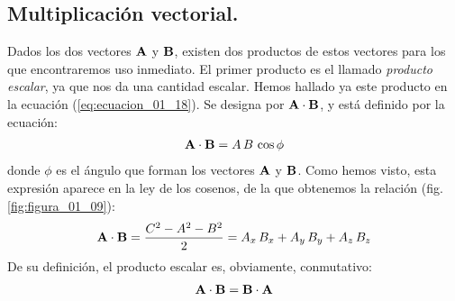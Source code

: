 \documentclass[12pt]{article}
\begin{document}
\subsection{Multiplicación vectorial.}

Dados los dos vectores $\vb{A}$ y $\vb{B}$, existen dos productos de estos vectores para los que encontraremos uso inmediato. El primer producto es el llamado \emph{producto escalar}, ya que nos da una cantidad escalar. Hemos hallado ya este producto en la ecuación (\ref{eq:ecuacion_01_18}). Se designa por $\vb{A} \cdot \vb{B}$, y está definido por la ecuación:
\begin{align}
    \vb{A} \cdot \vb{B} = A \, B \, \cos \phi
    \label{eq:ecuacion_01_20}
\end{align}
donde $\phi$ es el ángulo que forman los vectores $\vb{A}$ y $\vb{B}$. Como hemos visto, esta expresión aparece en la ley de los cosenos, de la que obtenemos la relación (fig. \ref{fig:figura_01_09}):
\begin{align}
    \vb{A} \cdot \vb{B} = \dfrac{C^{2} - A^{2} - B^{2}}{2} = A_{x} \, B_{x} + A_{y} \, B_{y} + A_{z} \, B_{z}
    \label{eq:ecuacion_01_21}
\end{align}
De su definición, el producto escalar es, obviamente, conmutativo:
\begin{align*}
    \vb{A} \cdot \vb{B} = \vb{B} \cdot \vb{A}
\end{align*}
\end{document}
